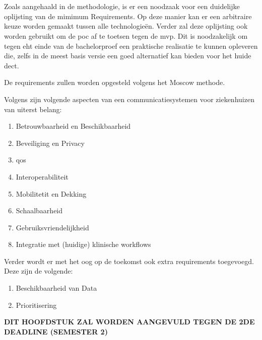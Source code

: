 \chapter{}%
\label{ch:minReq}

Zoals aangehaald in de methodologie, is er een noodzaak voor een duidelijke oplijsting van de mimimum Requirements. Op deze manier kan er een arbitraire keuze worden gemaakt tussen alle technologieën. Verder zal deze oplijsting ook worden gebruikt om de \acrshort{poc} af te toetsen tegen de \acrshort{mvp}. Dit is noodzakelijk om tegen eht einde van de bachelorproef een praktische realisatie te kunnen opleveren die, zelfs in de meest basis versie een goed alternatief kan bieden voor het huide \acrshort{dect}.

De requirements zullen worden opgesteld volgens het Moscow methode.

Volgens \textcite{Coiera2006} zijn volgende aspecten van een communicatiesystemen voor ziekenhuizen van uiterst belang:

\begin{enumerate}
    \item Betrouwbaarheid en Beschikbaarheid
    \item Beveiliging en Privacy
    \item \acrfull{qos}
    \item Interoperabiliteit
    \item Mobilitetit en Dekking
    \item Schaalbaarheid
    \item Gebruiksvriendelijkheid
    \item Integratie met (huidige) klinische workflows 
\end{enumerate}

Verder wordt er met het oog op de toekomst ook extra requirements toegevoegd. Deze zijn de volgende:

\begin{enumerate}
    \item Beschikbaarheid van Data
    \item Prioritisering
\end{enumerate}

\textbf{DIT HOOFDSTUK ZAL WORDEN AANGEVULD TEGEN DE 2DE DEADLINE (SEMESTER 2)}

\section{}
\label{sec:betrouwbaarheid-en-beschikbaarheid}


